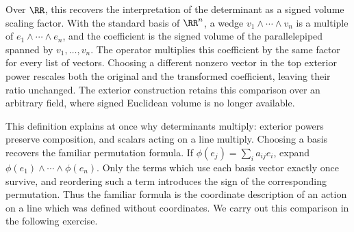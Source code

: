 \documentclass[12pt,reqno]{amsart}
\begin{document}
Over $\RR$, this recovers the interpretation of the determinant as a signed volume scaling factor. With the standard basis of $\RR^n$, a wedge $v_1\wedge\cdots\wedge v_n$ is a multiple of $e_1\wedge\cdots\wedge e_n$, and the coefficient is the signed volume of the parallelepiped spanned by $v_1,\ldots,v_n$. The operator multiplies this coefficient by the same factor for every list of vectors. Choosing a different nonzero vector in the top exterior power rescales both the original and the transformed coefficient, leaving their ratio unchanged. The exterior construction retains this comparison over an arbitrary field, where signed Euclidean volume is no longer available.

This definition explains at once why determinants multiply: exterior powers preserve composition, and scalars acting on a line multiply. Choosing a basis recovers the familiar permutation formula. If $\phi(e_j)=\sum_ia_{ij}e_i$, expand $\phi(e_1)\wedge\cdots\wedge\phi(e_n)$. Only the terms which use each basis vector exactly once survive, and reordering such a term introduces the sign of the corresponding permutation. Thus the familiar formula is the coordinate description of an action on a line which was defined without coordinates. We carry out this comparison in the following exercise.

\hrulefill
\end{document}
